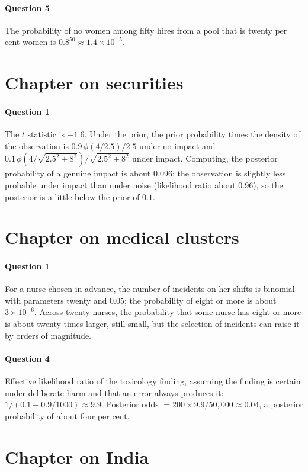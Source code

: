 \paragraph{Question 5} The probability of no women among fifty hires from a pool that is twenty per cent women is $0.8^{50}\approx 1.4\times 10^{-5}$.

\section*{Chapter on securities}
\paragraph{Question 1} The $t$ statistic is $-1.6$. Under the prior, the prior probability times the density of the observation is $0.9\,\phi(4/2.5)/2.5$ under no impact and $0.1\,\phi(4/\sqrt{2.5^2+8^2})/\sqrt{2.5^2+8^2}$ under impact. Computing, the posterior probability of a genuine impact is about $0.096$: the observation is slightly less probable under impact than under noise (likelihood ratio about $0.96$), so the posterior is a little below the prior of $0.1$.

\section*{Chapter on medical clusters}
\paragraph{Question 1} For a nurse chosen in advance, the number of incidents on her shifts is binomial with parameters twenty and $0.05$; the probability of eight or more is about $3\times 10^{-6}$. Across twenty nurses, the probability that some nurse has eight or more is about twenty times larger, still small, but the selection of incidents can raise it by orders of magnitude.
\paragraph{Question 4} Effective likelihood ratio of the toxicology finding, assuming the finding is certain under deliberate harm and that an error always produces it: $1/(0.1 + 0.9/1000)\approx 9.9$. Posterior odds $= 200\times 9.9/50{,}000\approx 0.04$, a posterior probability of about four per cent.

\section*{Chapter on India}
